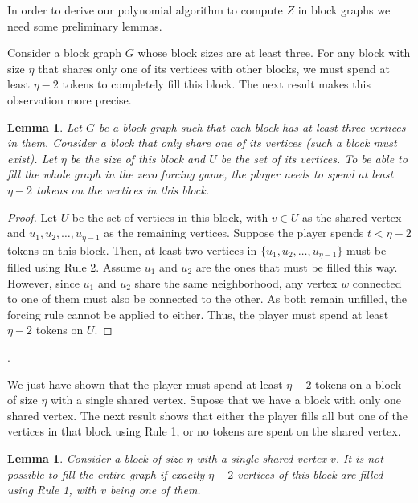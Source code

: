 \documentclass[11pt]{article}
\theoremstyle{plain}
\newtheorem{lemma}[theorem]{Lemma}
\theoremstyle{definition}
\theoremstyle{remark}
\begin{document}
In order to derive our polynomial algorithm to compute $Z$ in block graphs we need some preliminary lemmas.

Consider a block graph $G$ whose block sizes are at least three. For any block with size $\eta$ that shares only one of its vertices with other blocks, we must spend at least $\eta - 2$ tokens to completely fill this block. The next result makes this observation more precise.

\begin{lemma} \label{lemma:blockgrapheta}
Let $G$ be a block graph such that each block has at least three vertices in them. Consider a block that only share one of its vertices (such a block must exist). Let $\eta$ be the size of this block and $U$ be the set of its vertices. To be able to fill the whole graph in the zero forcing game, the player needs to spend at least $\eta - 2$ tokens on the vertices in this block.
\end{lemma}

\begin{proof}
Let $U$ be the set of vertices in this block, with $v \in U$ as the shared vertex and $u_1, u_2, \dots, u_{\eta -1}$ as the remaining vertices. Suppose the player spends $t < \eta - 2$ tokens on this block. Then, at least two vertices in $\{u_1, u_2, \dots, u_{\eta-1}\}$ must be filled using Rule 2. Assume $u_1$ and $u_2$ are the ones that must be filled this way. However, since $u_1$ and $u_2$ share the same neighborhood, any vertex $w$ connected to one of them must also be connected to the other. As both remain unfilled, the forcing rule cannot be applied to either. Thus, the player must spend at least $\eta - 2$ tokens on $U$.
\end{proof}.

We just have shown that the player must spend at least $\eta - 2$ tokens on a block of size $\eta$ with a single shared vertex. Supose that we have a block with only one shared vertex. The next result shows that either the player fills all but one of the vertices in that block using Rule 1, or no tokens are spent on the shared vertex.

\begin{lemma} \label{lemma:unfilledshared}
    Consider a block of size $\eta$ with a single shared vertex $v$. It is not possible to fill the entire graph if exactly $\eta - 2$ vertices of this block are filled using Rule 1, with $v$ being one of them. 
\end{lemma}
\end{document}
